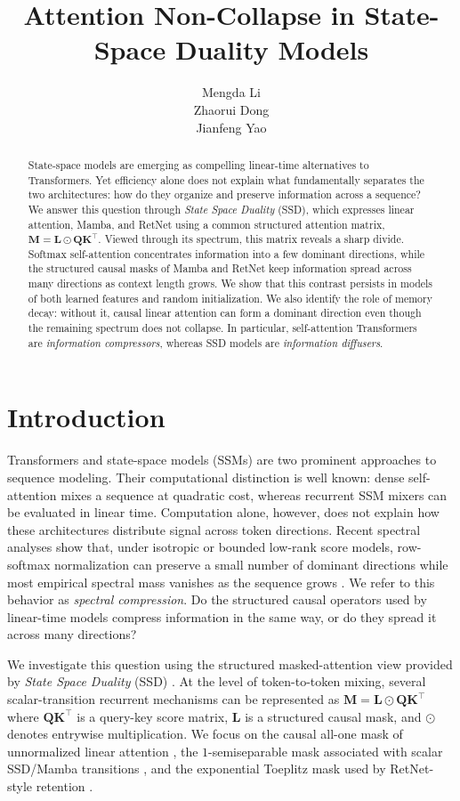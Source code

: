 \documentclass{article}
\title{Attention Non-Collapse in State-Space Duality Models}
\author{Mengda Li \\
       \And
       Zhaorui Dong \\
       \And
       Jianfeng Yao}
\newcommand{\hadamard}{\mathbin{\odot}}
\newcommand{\bM}{\mathbf{M}}
\newcommand{\bL}{\mathbf{L}}
\newcommand{\bQ}{\mathbf{Q}}
\newcommand{\bK}{\mathbf{K}}
\theoremstyle{definition}
\theoremstyle{remark}
\begin{document}
\maketitle

\begin{abstract}
State-space models are emerging as compelling linear-time alternatives to
Transformers.  Yet efficiency alone does not explain what fundamentally
separates the two architectures: how do they organize and preserve information
across a sequence?  We answer this question through \emph{State Space Duality}
(SSD), which expresses linear attention, Mamba, and RetNet using a common
structured attention matrix,
\(
    \bM=\bL\hadamard\bQ\bK^\top.
\)
Viewed through its spectrum, this matrix reveals a sharp divide.  Softmax
self-attention concentrates information into a few dominant directions, while
the structured causal masks of Mamba and RetNet keep information spread across
many directions as context length grows.  We show that this contrast persists
in models of both learned features and random initialization.  We also identify
the role of memory decay: without it, causal linear attention can form a
dominant direction even though the remaining spectrum does not collapse.  In
particular, self-attention
Transformers are \emph{information compressors}, whereas SSD
models are \emph{information diffusers}.
\end{abstract}

\section{Introduction}
Transformers and state-space models (SSMs) are two prominent approaches to
sequence modeling.  Their computational distinction is well known: dense
self-attention mixes a sequence at quadratic cost, whereas recurrent SSM
mixers can be evaluated in linear time.  Computation alone, however, does not
explain how these architectures distribute signal across token directions.
Recent spectral analyses show that, under isotropic or bounded low-rank score
models, row-softmax normalization can preserve a small number of dominant
directions while most empirical spectral mass vanishes as the sequence grows
\citep{li:2026spectral}.  We refer to this behavior as \emph{spectral
compression}.  Do the structured causal operators used by linear-time models
compress information in the same way, or do they spread it across many
directions?

We investigate this question using the structured masked-attention view
provided by \emph{State Space Duality} (SSD) \citep{mamba2}.  At the level of
token-to-token mixing, several scalar-transition recurrent mechanisms can be
represented as
\(
        \bM=\bL\hadamard \bQ\bK^\top
        \)
where $\bQ\bK^\top$ is a query-key score matrix, $\bL$ is a structured causal
mask, and $\hadamard$ denotes entrywise multiplication.  We focus on the causal
all-one mask of unnormalized linear attention \citep{linear_attn}, the
$1$-semiseparable mask associated with scalar SSD/Mamba transitions
\citep{mamba1,mamba2}, and the exponential Toeplitz mask used by RetNet-style
retention \citep{sun:2023retentive}.  
\end{document}
